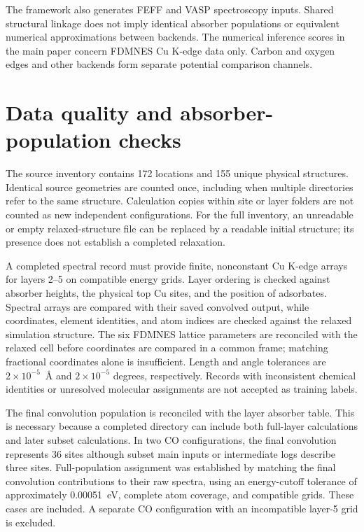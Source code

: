 \documentclass[11pt,a4paper]{article}
\begin{document}
The framework also generates FEFF and VASP spectroscopy inputs.\cite{rehr2010,vaspxas} Shared structural linkage does not imply identical absorber populations or equivalent numerical approximations between backends. The numerical inference scores in the main paper concern FDMNES Cu K-edge data only. Carbon and oxygen edges and other backends form separate potential comparison channels.

\section{Data quality and absorber-population checks}
The source inventory contains 172 locations and 155 unique physical structures. Identical source geometries are counted once, including when multiple directories refer to the same structure. Calculation copies within site or layer folders are not counted as new independent configurations. For the full inventory, an unreadable or empty relaxed-structure file can be replaced by a readable initial structure; its presence does not establish a completed relaxation.

A completed spectral record must provide finite, nonconstant Cu K-edge arrays for layers 2--5 on compatible energy grids. Layer ordering is checked against absorber heights, the physical top Cu sites, and the position of adsorbates. Spectral arrays are compared with their saved convolved output, while coordinates, element identities, and atom indices are checked against the relaxed simulation structure. The six FDMNES lattice parameters are reconciled with the relaxed cell before coordinates are compared in a common frame; matching fractional coordinates alone is insufficient. Length and angle tolerances are $2\times10^{-5}$~\AA{} and $2\times10^{-5}$ degrees, respectively. Records with inconsistent chemical identities or unresolved molecular assignments are not accepted as training labels.

The final convolution population is reconciled with the layer absorber table. This is necessary because a completed directory can include both full-layer calculations and later subset calculations. In two CO configurations, the final convolution represents 36 sites although subset main inputs or intermediate logs describe three sites. Full-population assignment was established by matching the final convolution contributions to their raw spectra, using an energy-cutoff tolerance of approximately 0.00051~eV, complete atom coverage, and compatible grids. These cases are included. A separate CO configuration with an incompatible layer-5 grid is excluded.
\end{document}

